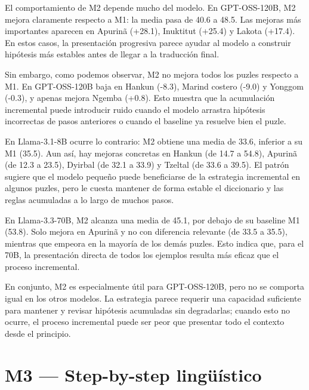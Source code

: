 El comportamiento de M2 depende mucho del modelo. En GPT-OSS-120B, M2 mejora claramente respecto a M1: la media pasa de 40.6 a 48.5. Las mejoras más importantes aparecen en Apurinã (+28.1), Inuktitut (+25.4) y Lakota (+17.4). En estos casos, la presentación progresiva parece ayudar al modelo a construir hipótesis más estables antes de llegar a la traducción final.

Sin embargo, como podemos observar, M2 no mejora todos los puzles respecto a M1. En GPT-OSS-120B baja en Hankun (-8.3), Marind costero (-9.0) y Yonggom (-0.3), y apenas mejora Ngemba (+0.8). Esto muestra que la acumulación incremental puede introducir ruido cuando el modelo arrastra hipótesis incorrectas de pasos anteriores o cuando el baseline ya resuelve bien el puzle.

En Llama-3.1-8B ocurre lo contrario: M2 obtiene una media de 33.6, inferior a su M1 (35.5). Aun así, hay mejoras concretas en Hankun (de 14.7 a 54.8), Apurinã (de 12.3 a 23.5), Dyirbal (de 32.1 a 33.9) y Tzeltal (de 33.6 a 39.5). El patrón sugiere que el modelo pequeño puede beneficiarse de la estrategia incremental en algunos puzles, pero le cuesta mantener de forma estable el diccionario y las reglas acumuladas a lo largo de muchos pasos.

En Llama-3.3-70B, M2 alcanza una media de 45.1, por debajo de su baseline M1 (53.8). Solo mejora en Apurinã y no con diferencia relevante (de 33.5 a 35.5), mientras que empeora en la mayoría de los demás puzles. Esto indica que, para el 70B, la presentación directa de todos los ejemplos resulta más eficaz que el proceso incremental.

En conjunto, M2 es especialmente útil para GPT-OSS-120B, pero no se comporta igual en los otros modelos. La estrategia parece requerir una capacidad suficiente para mantener y revisar hipótesis acumuladas sin degradarlas; cuando esto no ocurre, el proceso incremental puede ser peor que presentar todo el contexto desde el principio.

\section{M3 — Step-by-step lingüístico}
\label{sec:resultados_m3}

